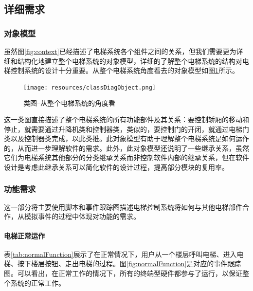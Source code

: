 \subsection{详细需求}
\label{sec:detailRequirements}

\subsubsection{对象模型}
虽然图\ref{fig:context}已经描述了电梯系统各个组件之间的关系，但我们需要更为详细和结构化地建立整个电梯系统的对象模型，详细的了解整个电梯系统的结构对电梯控制系统的设计十分重要。从整个电梯系统角度看去的对象模型如图\ref{fig:classDiagObject}所示。\par
\begin{figure}[H]
	\centering
	\texttt{[image: resources/classDiagObject.png]}
	\caption{类图--从整个电梯系统的角度看}
	\label{fig:classDiagObject}
\end{figure}\par

这一类图直接描述了整个电梯系统的所有功能部件及其关系：要控制轿厢的移动和停止，就需要通过升降机类和控制器类，类似的，要控制门的开闭，就通过电梯门类以及控制器类完成，以此类推。此对象模型有助于理解整个电梯系统是如何运作的，从而进一步理解软件的需求。此外，此对象模型还说明了一些继承关系，虽然它们为电梯系统其他部分的分类继承关系而非控制软件内部的继承关系，但在软件设计是考虑此继承关系可以简化软件的设计过程，提高部分模块的复用率。

\subsubsection{功能需求}
这一部分将主要使用脚本和事件跟踪图描述电梯控制系统将如何与其他电梯部件合作，从模拟事件的过程中体现对功能的需求。

\paragraph{电梯正常运作}
表\ref{tab:normalFunction}展示了在正常情况下，用户从一个楼层呼叫电梯、进入电梯、按下楼层按钮、走出电梯的过程。图\ref{fig:normalFunction}是对应的事件跟踪图。可以看出，在正常工作的情况下，所有的终端型硬件都参与了运行，以保证整个系统的正常工作。

